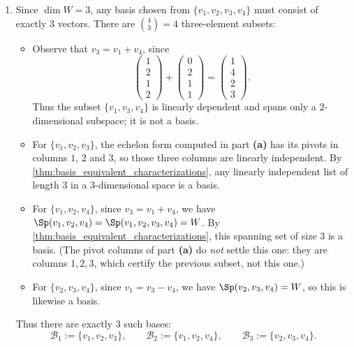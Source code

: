 \begin{exercisesolution*}
\begin{enumerate}[label=\textbf{(\alph*)}]
    \item Since $\dim W = 3$, any basis chosen from $\{v_1, v_2, v_3, v_4\}$ must consist of exactly $3$ vectors. There are $\binom{4}{3} = 4$ three-element subsets:
    \begin{itemize}
        \item Observe that $v_3 = v_1 + v_4$, since
        \[
            \begin{pmatrix} 1 \\ 2 \\ 1 \\ 2 \end{pmatrix} + \begin{pmatrix} 0 \\ 2 \\ 1 \\ 1 \end{pmatrix} = \begin{pmatrix} 1 \\ 4 \\ 2 \\ 3 \end{pmatrix}.
        \]
        Thus the subset $\{v_1, v_3, v_4\}$ is linearly dependent and spans only a $2$-dimensional subspace; it is not a basis.
        \item For $\{v_1, v_2, v_3\}$, the echelon form computed in part \textbf{(a)} has its pivots in columns $1$, $2$ and $3$, so those three columns are linearly independent. By \cref{thm:basis_equivalent_characterizations}, any linearly independent list of length $3$ in a $3$-dimensional space is a basis.
        \item For $\{v_1, v_2, v_4\}$, since $v_3 = v_1 + v_4$, we have $\Sp(v_1, v_2, v_4) = \Sp(v_1, v_2, v_3, v_4) = W$. By \cref{thm:basis_equivalent_characterizations}, this spanning set of size $3$ is a basis. (The pivot columns of part \textbf{(a)} do \emph{not} settle this one: they are columns $1,2,3$, which certify the previous subset, not this one.)
        \item For $\{v_2, v_3, v_4\}$, since $v_1 = v_3 - v_4$, we have $\Sp(v_2, v_3, v_4) = W$, so this is likewise a basis.
    \end{itemize}
    Thus there are exactly $3$ such bases:
    \[
        \mathcal{B}_1 := \{v_1, v_2, v_3\}, \qquad \mathcal{B}_2 := \{v_1, v_2, v_4\}, \qquad \mathcal{B}_3 := \{v_2, v_3, v_4\}.
    \]
\end{enumerate}
\end{exercisesolution*}

